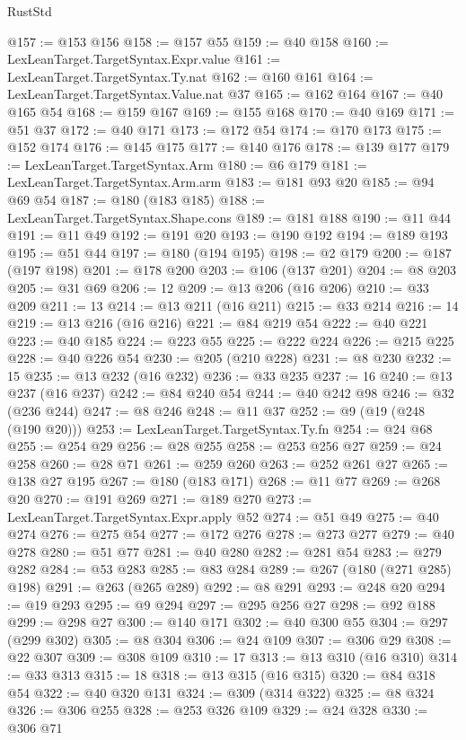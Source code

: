\begin{lexlean}{RustStd}
\begin{coremodule}
{\begin{coremodule}
{{{{{{{{{{{{{{{{{{{{{{{{{{{{{{{{{{{@157 := @153 @156
@158 := @157 @55
@159 := @40 @158
@160 := LexLeanTarget.TargetSyntax.Expr.value
@161 := LexLeanTarget.TargetSyntax.Ty.nat
@162 := @160 @161
@164 := LexLeanTarget.TargetSyntax.Value.nat @37
@165 := @162 @164
@167 := @40 @165 @54
@168 := @159 @167
@169 := @155 @168
@170 := @40 @169
@171 := @51 @37
@172 := @40 @171
@173 := @172 @54
@174 := @170 @173
@175 := @152 @174
@176 := @145 @175
@177 := @140 @176
@178 := @139 @177
@179 := LexLeanTarget.TargetSyntax.Arm
@180 := @6 @179
@181 := LexLeanTarget.TargetSyntax.Arm.arm
@183 := @181 @93 @20
@185 := @94 @69 @54
@187 := @180 (@183 @185)
@188 := LexLeanTarget.TargetSyntax.Shape.cons
@189 := @181 @188
@190 := @11 @44
@191 := @11 @49
@192 := @191 @20
@193 := @190 @192
@194 := @189 @193
@195 := @51 @44
@197 := @180 (@194 @195)
@198 := @2 @179
@200 := @187 (@197 @198)
@201 := @178 @200
@203 := @106 (@137 @201)
@204 := @8 @203
@205 := @31 @69
@206 := 12
@209 := @13 @206 (@16 @206)
@210 := @33 @209
@211 := 13
@214 := @13 @211 (@16 @211)
@215 := @33 @214
@216 := 14
@219 := @13 @216 (@16 @216)
@221 := @84 @219 @54
@222 := @40 @221
@223 := @40 @185
@224 := @223 @55
@225 := @222 @224
@226 := @215 @225
@228 := @40 @226 @54
@230 := @205 (@210 @228)
@231 := @8 @230
@232 := 15
@235 := @13 @232 (@16 @232)
@236 := @33 @235
@237 := 16
@240 := @13 @237 (@16 @237)
@242 := @84 @240 @54
@244 := @40 @242 @98
@246 := @32 (@236 @244)
@247 := @8 @246
@248 := @11 @37
@252 := @9 (@19 (@248 (@190 @20)))
@253 := LexLeanTarget.TargetSyntax.Ty.fn
@254 := @24 @68
@255 := @254 @29
@256 := @28 @255
@258 := @253 @256 @27
@259 := @24 @258
@260 := @28 @71
@261 := @259 @260
@263 := @252 @261 @27
@265 := @138 @27 @195
@267 := @180 (@183 @171)
@268 := @11 @77
@269 := @268 @20
@270 := @191 @269
@271 := @189 @270
@273 := LexLeanTarget.TargetSyntax.Expr.apply @52
@274 := @51 @49
@275 := @40 @274
@276 := @275 @54
@277 := @172 @276
@278 := @273 @277
@279 := @40 @278
@280 := @51 @77
@281 := @40 @280
@282 := @281 @54
@283 := @279 @282
@284 := @53 @283
@285 := @83 @284
@289 := @267 (@180 (@271 @285) @198)
@291 := @263 (@265 @289)
@292 := @8 @291
@293 := @248 @20
@294 := @19 @293
@295 := @9 @294
@297 := @295 @256 @27
@298 := @92 @188
@299 := @298 @27
@300 := @140 @171
@302 := @40 @300 @55
@304 := @297 (@299 @302)
@305 := @8 @304
@306 := @24 @109
@307 := @306 @29
@308 := @22 @307
@309 := @308 @109
@310 := 17
@313 := @13 @310 (@16 @310)
@314 := @33 @313
@315 := 18
@318 := @13 @315 (@16 @315)
@320 := @84 @318 @54
@322 := @40 @320 @131
@324 := @309 (@314 @322)
@325 := @8 @324
@326 := @306 @255
@328 := @253 @326 @109
@329 := @24 @328
@330 := @306 @71
}}}}}}}}}}}}}}}}}}}}}}}}}}}}}}}}}}}
\end{coremodule}}
\end{coremodule}
\end{lexlean}
